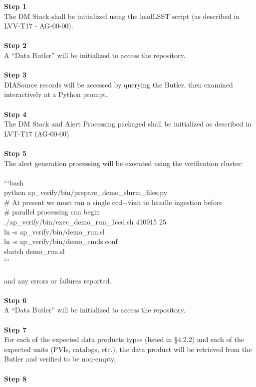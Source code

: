 \textbf{Step 1}\\
The DM Stack shall be initialized using the loadLSST script (as
described in LVV-T17 - AG-00-00).\\
~\\
\textbf{Step 2}\\
A ``Data Butler'' will be initialized to access the repository.\\
~\\
\textbf{Step 3}\\
DIASource records will be accessed by querying the Butler, then examined
interactively at a Python prompt.\\
~\\
\textbf{Step 4}\\
The DM Stack and Alert Processing packaged shall be initialized as
described in LVT-T17 (AG-00-00).\\
~\\
\textbf{Step 5}\\
The alert generation processing will be executed using the verification
cluster:\\
~\\
```bash\\
python ap\_verify/bin/prepare\_demo\_slurm\_files.py\\
\# At present we must run a single ccd+visit to handle ingestion
before\\
\# parallel processing can begin\\
./ap\_verify/bin/exec\_demo\_run\_1ccd.sh 410915 25\\
ln -s ap\_verify/bin/demo\_run.sl\\
ln -s ap\_verify/bin/demo\_cmds.conf\\
sbatch demo\_run.sl\\
```\\
~\\
and any errors or failures reported.\\
~\\
\textbf{Step 6}\\
A ``Data Butler'' will be initialized to access the repository.\\
~\\
\textbf{Step 7}\\
For each of the expected data products types (listed in §4.2.2) and each
of the expected units (PVIs, catalogs, etc.), the data product will be
retrieved from the Butler and verified to be non-empty.\\
~\\
\textbf{Step 8}\\
